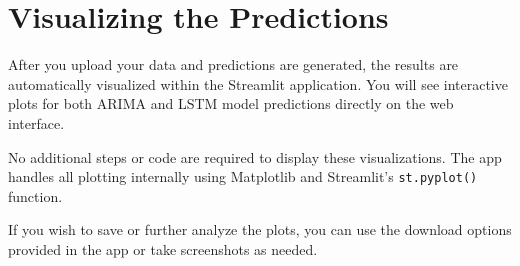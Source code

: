 \clearpage

\section{Visualizing the Predictions}

After you upload your data and predictions are generated, the results are automatically visualized within the Streamlit application. You will see interactive plots for both ARIMA and LSTM model predictions directly on the web interface.

No additional steps or code are required to display these visualizations. The app handles all plotting internally using Matplotlib and Streamlit's \texttt{st.pyplot()} function.

If you wish to save or further analyze the plots, you can use the download options provided in the app or take screenshots as needed.


